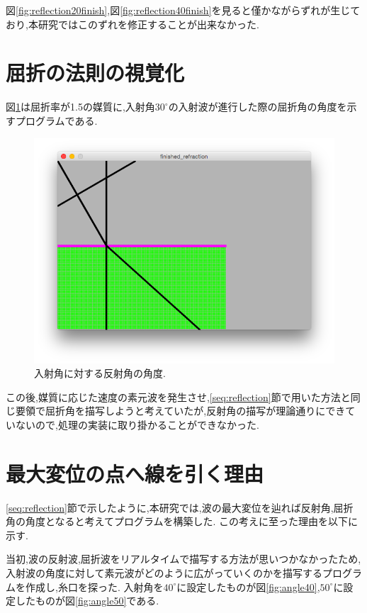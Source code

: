 図\ref{fig:reflection20finish},図\ref{fig:reflection40finish}を見ると僅かながらずれが生じており,本研究ではこのずれを修正することが出来なかった.
\section{屈折の法則の視覚化}
図\ref{fig:refraction}は屈折率が1.5の媒質に,入射角$30^{\circ}$の入射波が進行した際の屈折角の角度を示すプログラムである.
\begin{figure}[H]
 \begin{center}
  \includegraphics[width=130mm]{../result/refractionangle3015.png}
 \end{center}
 \caption{入射角に対する反射角の角度.}
 \label{fig:refraction}
\end{figure}

この後,媒質に応じた速度の素元波を発生させ,\ref{seq:reflection}節で用いた方法と同じ要領で屈折角を描写しようと考えていたが,反射角の描写が理論通りにできていないので,処理の実装に取り掛かることができなかった.


\section{最大変位の点へ線を引く理由}
\label{sec:hansyaarugorizumu}
\ref{seq:reflection}節で示したように,本研究では,波の最大変位を辿れば反射角,屈折角の角度となると考えてプログラムを構築した. この考えに至った理由を以下に示す.

当初,波の反射波,屈折波をリアルタイムで描写する方法が思いつかなかったため,入射波の角度に対して素元波がどのように広がっていくのかを描写するプログラムを作成し,糸口を探った. 入射角を$40^{\circ}$に設定したものが図\ref{fig:angle40},$50^{\circ}$に設定したものが図\ref{fig:angle50}である.


